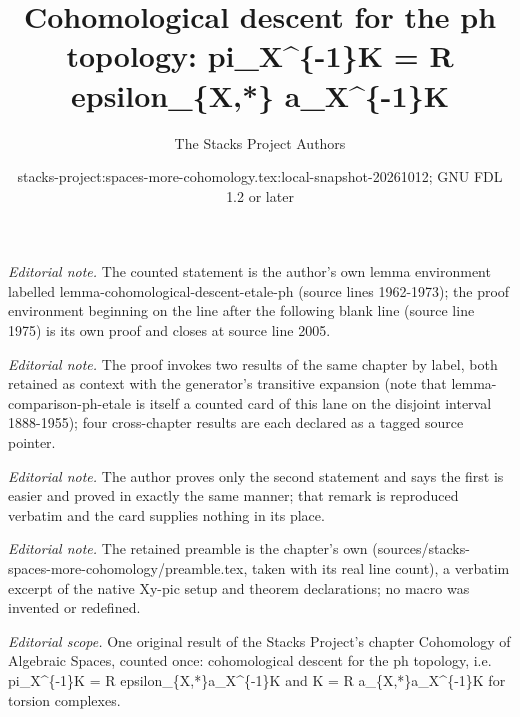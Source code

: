 \documentclass{stacks-project}
\title{Cohomological descent for the ph topology: pi\_X\textasciicircum{}\{-1\}K = R epsilon\_\{X,*\} a\_X\textasciicircum{}\{-1\}K}
\author{The Stacks Project Authors}
\date{stacks-project:spaces-more-cohomology.tex:local-snapshot-20261012; GNU FDL 1.2 or later}
\theoremstyle{plain}
\theoremstyle{definition}
\theoremstyle{remark}
\numberwithin{equation}{subsection}
\begin{document}
\maketitle
\noindent\textit{Editorial note.} The counted statement is the author's own lemma environment labelled lemma-cohomological-descent-etale-ph (source lines 1962-1973); the proof environment beginning on the line after the following blank line (source line 1975) is its own proof and closes at source line 2005.\par\medskip
\noindent\textit{Editorial note.} The proof invokes two results of the same chapter by label, both retained as context with the generator's transitive expansion (note that lemma-comparison-ph-etale is itself a counted card of this lane on the disjoint interval 1888-1955); four cross-chapter results are each declared as a tagged source pointer.\par\medskip
\noindent\textit{Editorial note.} The author proves only the second statement and says the first is easier and proved in exactly the same manner; that remark is reproduced verbatim and the card supplies nothing in its place.\par\medskip
\noindent\textit{Editorial note.} The retained preamble is the chapter's own (sources/stacks-spaces-more-cohomology/preamble.tex, taken with its real line count), a verbatim excerpt of the native Xy-pic setup and theorem declarations; no macro was invented or redefined.\par\medskip
\noindent\textit{Editorial scope.} One original result of the Stacks Project's chapter Cohomology of Algebraic Spaces, counted once: cohomological descent for the ph topology, i.e. pi\_X\textasciicircum{}\{-1\}K = R epsilon\_\{X,*\}a\_X\textasciicircum{}\{-1\}K and K = R a\_\{X,*\}a\_X\textasciicircum{}\{-1\}K for torsion complexes.\par\medskip
\end{document}

